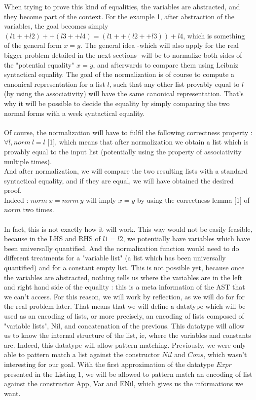 \documentclass{sigplanconf}
\begin{document}
When trying to prove this kind of equalities, the variables are abstracted, and they become part of the context. For the example 1, after abstraction of the variables, the goal becomes simply $(l1 ++ l2) ++ (l3 ++ l4) = (l1 ++ (l2 ++ l3)) + l4$, which is something of the general form $x=y$.
The general idea -which will also apply for the real bigger problem detailed in the next sections- will be to normalize both sides of the "potential equality" $x=y$, and afterwards to compare them using Leibniz syntactical equality.
The goal of the normalization is of course to compute a canonical representation for a list $l$, such that any other list provably equal to $l$ (by using the associativity) will have the same canonical representation. That's why it will be possible to decide the equality by simply comparing the two normal forms with a week syntactical equality. \\
\\
Of course, the normalization will have to fulfil the following correctness property :
$\forall l, norm\ l = l$ [1], which means that after normalization we obtain a list which is provably equal to the input list (potentially using the property of associativity multiple times). \\
And after normalization, we will compare the two resulting lists with a standard syntactical equality, and if they are equal, we will have obtained the desired proof.  \\
Indeed :
$norm\ x = norm\ y$ will imply $x=y$ by using the correctness lemma [1] of $norm$ two times. \\
\\
In fact, this is not exactly how it will work. This way would not be easily feasible, because in the LHS and RHS of $l1=l2$, we potentially have variables which have been universally quantified. And the normalization function would need to do different treatments for a "variable list" (a list which has been universally quantified) and for a constant empty list. This is not possible yet, because once the variables are abstracted, nothing tells us where the variables are in the left and right hand side of the equality : this is a meta information of the AST that we can't access.
For this reason, we will work by reflection, as we will do for for the real problem later. That means that we will define a datatype which will be used as an encoding of lists, or more precisely, an encoding of lists composed of "variable lists", Nil, and concatenation of the previous. This datatype will allow us to know the internal structure of the list, ie, where the variables and constants are.
Indeed, this datatype will allow pattern matching. Previously, we were only able to pattern match a list against the constructor $Nil$ and $Cons$, which wasn't interesting for our goal.  With the first approximation of the datatype $Expr$ presented in the Listing 1, we will be allowed to pattern match an encoding of list against the constructor App, Var and ENil, which gives us the informations we want.
\end{document}
